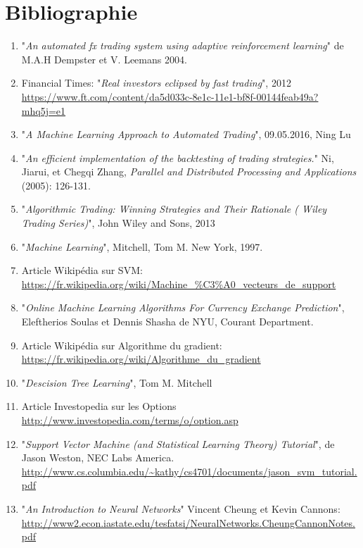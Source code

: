 \documentclass[a4paper, 11pt]{article}
\begin{document}
\section{Bibliographie}

\begin{enumerate}
\item "\textit{An automated fx trading system using adaptive reinforcement learning}" de M.A.H Dempster et V. Leemans 2004. \label{fx trading}
\item Financial Times: "\textit{Real investors eclipsed by fast trading}", 2012 \url{https://www.ft.com/content/da5d033c-8e1c-11e1-bf8f-00144feab49a?mhq5j=e1} \label{real investors}
\item "\textit{A Machine Learning Approach to Automated Trading}", 09.05.2016, Ning Lu \label{machine learning automated trading}
\item "\textit{An efficient implementation of the backtesting of trading strategies.}" Ni, Jiarui, et Chegqi Zhang, \textit{Parallel and Distributed Processing and Applications} (2005): 126-131.
\item "\textit{Algorithmic Trading: Winning Strategies and Their Rationale ( Wiley Trading Series)}", John Wiley and Sons, 2013
\item "\textit{Machine Learning}", Mitchell, Tom M. New York, 1997. \label{mitchell}
\item Article Wikipédia sur SVM: \url{https://fr.wikipedia.org/wiki/Machine_\%C3\%A0_vecteurs_de_support} \label{wikipedia svm}
\item "\textit{Online Machine Learning Algorithms For Currency Exchange Prediction}", Eleftherios Soulas et Dennis Shasha de NYU, Courant Department. \label{descente du gradient stochastique}
\item  Article Wikipédia sur Algorithme du gradient: \url{https://fr.wikipedia.org/wiki/Algorithme_du_gradient} \label{wikipedia descente du gradient}
\item "\textit{Descision Tree Learning}", Tom M. Mitchell \label{id3}
\item Article Investopedia sur les Options \url{http://www.investopedia.com/terms/o/option.asp}
\item "\textit{Support Vector Machine (and Statistical Learning Theory) Tutorial}", de Jason Weston, NEC Labs America. \url{http://www.cs.columbia.edu/~kathy/cs4701/documents/jason_svm_tutorial.pdf} \label{svm equation}
\item  "\textit{An Introduction to Neural Networks}" Vincent Cheung et Kevin Cannons: \url{http://www2.econ.iastate.edu/tesfatsi/NeuralNetworks.CheungCannonNotes.pdf}

\end{enumerate}
\end{document}
